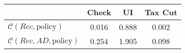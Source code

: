 \begin{tabular}{@{}lccc@{}}
\toprule
                          & Check      & UI    & Tax Cut    \\  \midrule
$\mathcal{C}(Rec,\text{policy})$ & 0.016  & 0.888  & 0.002     \\
$\mathcal{C}(Rec, AD,\text{policy})$ & 0.254  & 1.905  & 0.098     \\
\end{tabular}
